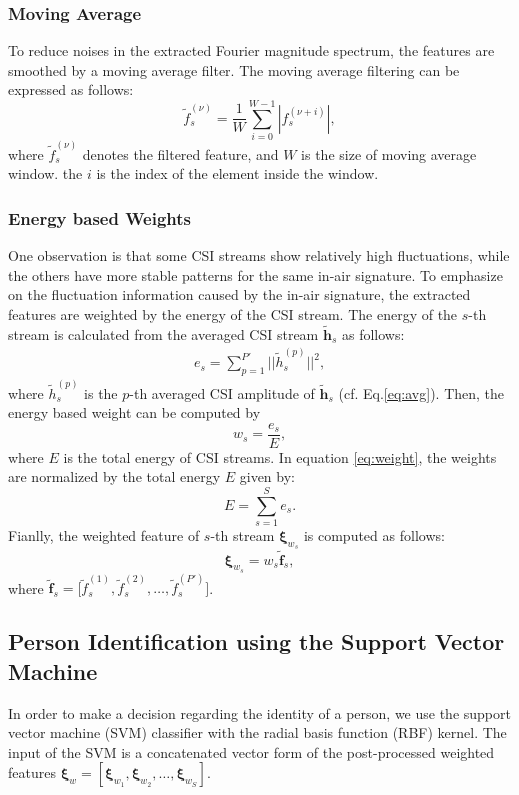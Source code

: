 \subsubsection{Moving Average}
To reduce noises in the extracted Fourier magnitude spectrum, the features are smoothed by a moving average filter. The moving average filtering can be expressed as follows:
\begin{equation}
\tilde{f}^{(\nu)}_{s}=\frac{1}{W}\sum_{i=0}^{W-1}|f^{(\nu+i)}_{s}|,
\end{equation}
where $\tilde{f}^{(\nu)}_{s}$ denotes the filtered feature, and $W$ is the size of moving average window. the $i$ is the index of the element inside the window. 

\subsubsection{Energy based Weights}
\label{sec:energy}
One observation is that some CSI streams show relatively high fluctuations, while the others have more stable patterns for the same in-air signature. To emphasize on the  fluctuation information caused by the in-air signature, the extracted features are weighted by the energy of the CSI stream. The energy of the $s$-th stream is calculated from the averaged CSI stream $\tilde{\textbf{h}}_{s}$ as follows:
\begin{align}
e_{s}=\sum_{p=1}^{P'}||\tilde{h}^{(p)}_{s}||^{2},
\end{align} 
where $\tilde{h}^{(p)}_{s}$ is the $p$-th averaged CSI amplitude of $\tilde{\textbf{h}}_{s}$ (cf. Eq.\ref{eq:avg}).
Then, the energy based weight can be computed by
\begin{equation}
w_{s}=\frac{e_{s}}{E},
\label{eq:weight}
\end{equation}
where $E$ is the total energy of CSI streams. In equation \ref{eq:weight}, the weights are normalized by the total energy $E$ given by:
\begin{equation}
E=\sum_{s=1}^{S}e_{s}.
\end{equation}    
Fianlly, the weighted feature of $s$-th stream $\boldsymbol{\xi}_{w_{s}}$ is computed as follows:
\begin{equation}
\boldsymbol{\xi}_{w_{s}}=w_{s}\tilde{\textbf{f}}_{s},
\end{equation}
where $\tilde{\textbf{f}}_{s}=\big[\tilde{f}^{(1)}_{s}, \tilde{f}^{(2)}_{s}, \hdots, \tilde{f}^{(P')}_{s}\big]$. 

\newpage
\subsection{Person Identification using the Support Vector Machine}
In order to make a decision regarding the identity of a person, we use the support vector machine (SVM) classifier with the radial basis function (RBF) kernel. The input of the SVM is a concatenated vector form of the post-processed weighted features  $\boldsymbol{\xi}_{w}=[\boldsymbol{\xi}_{w_{1}}, \boldsymbol{\xi}_{w_{2}}, \hdots , \boldsymbol{\xi}_{w_{S}}]$.

